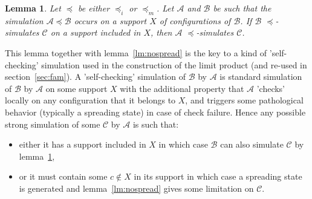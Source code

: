 \documentclass[a4paper]{elsarticle}
\def\qed{\relax\ifmmode\hskip2em \blacksquare\else\unskip\nobreak\hfill\hskip1em $\blacksquare$\fi}
\newcommand{\ACA}{\mathcal{A}}
\newcommand{\ACB}{\mathcal{B}}
\newcommand{\ACC}{\mathcal{C}}
\newcommand\alphabe[1]{S_{#1}}
\newcommand{\alphA}{\alphabe{\ACA}}
\newcommand{\alphB}{\alphabe{\ACB}}
\newcommand{\alphC}{\alphabe{\ACC}}
\newcommand\sac{\sqsubseteq}
\newcommand\bulk[2]{{#1}^{\left\langle{#2}\right\rangle}}
\newcommand{\simu}{\preccurlyeq}
\newcommand{\sacsimu}{\simu_i}
\newcommand{\facsacsimu}{\simu_m}
\newtheorem{lm}{Lemma}[section]
\begin{document}
\begin{lm}
  \label{lm:lift}
  Let $\simu$ be either $\sacsimu$ or $\facsacsimu$.  Let $\ACA$ and
  $\ACB$ be such that the simulation ${\ACA\simu\ACB}$ occurs on a
  support $X$ of configurations of $\ACB$. If $\ACB$ $\simu$-simulates
  $\ACC$ on a support included in $X$, then $\ACA$ $\simu$-simulates
  $\ACC$.
\end{lm}


This lemma together with lemma~\ref{lm:nospread} is the key to a kind
of 'self-checking' simulation used in the construction of the limit
product (and re-used in section~\ref{sec:fam}). A 'self-checking'
simulation of $\ACB$ by $\ACA$ is standard simulation of $\ACB$ by
$\ACA$ on some support $X$ with the additional property that $\ACA$
'checks' locally on any configuration that it belongs to $X$, and
triggers some pathological behavior (typically a spreading state) in
case of check failure.  Hence any possible strong simulation of some
$\ACC$ by $\ACA$ is such that:
\begin{itemize}
\item either it has a support included in $X$ in which case $\ACB$ can
  also simulate $\ACC$ by lemma~\ref{lm:lift},
\item or it must contain some ${c\not\in X}$ in its support in which
  case a spreading state is generated and lemma~\ref{lm:nospread}
  gives some limitation on $\ACC$.
\end{itemize}
\end{document}
